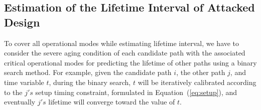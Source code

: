 \begin{comment}
\subsection{Estimation of the Lifetime Interval of Attacked Design}
Based on the assumption, the union of critical operational modes of all candidate paths is equivalent to the universal set of operational modes, i.e., all operational modes. Thus, for the purpose of covering all operational modes, we have to consider the severe aging condition of each candidate path with the associated critical operational modes for predicting the lifetime of other paths using a binary search method.

For example, given the candidate path $i$, the other path $j$, and time variable $t$, the goal of the method is to predict $j's$ lifetime by binarily searching toward a convergent $t$. That is, during the binary search, the timing variable $t$ will be iteratively calibrated according to the $j's$ setup timing constraint, formulated in Equation~(\ref{eq:setup}), and eventually $j's$ lifetime will converge toward the value of $t$. Where $j's$ aging rate is derived by the aging correlation between $i$ and $j$ (i.e., regression equation of $i$ on $j$) and $i's$ aging rate is derived from Equation~(\ref{eq:worst}). 
As a result, when $i$ is considered undergoing severe aging, we can obtain the other paths' lifetimes, among which we choose the smallest one as the lifetime of the attacked design.

In accordance with the former procedure, we can derive one lifetime value of a path which has been compromised with malicious aging. In cases of all candidate paths undergoing severe aging, we can derive a group of lifetime values, among which smallest one and biggest one are the resulting interval boundaries, and they also represent the earliest and latest fail time points, on behalf of the consequence of implanted Trojan.
\end{comment}
\subsection{Estimation of the Lifetime Interval of Attacked Design}
To cover all operational modes while estimating lifetime interval, we have to consider the severe aging condition of each candidate path with the associated critical operational modes for predicting the lifetime of other paths using a binary search method.
For example, given the candidate path $i$, the other path $j$, and time variable $t$, during the binary search, $t$ will be iteratively calibrated according to the $j's$ setup timing constraint, formulated in Equation~(\ref{eq:setup}), and eventually $j's$ lifetime will converge toward the value of $t$. %

